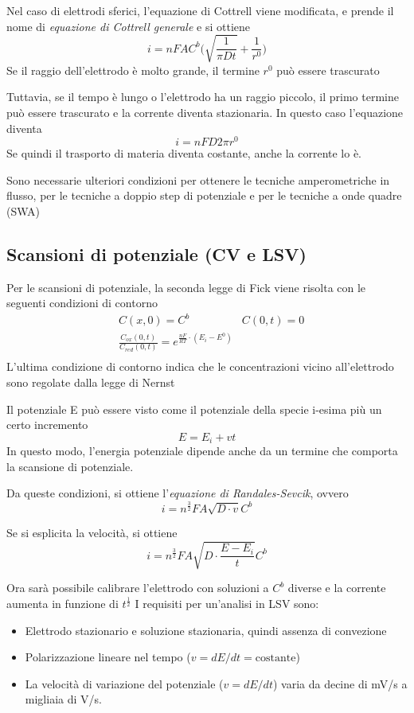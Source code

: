 
Nel caso di elettrodi sferici, l'equazione di Cottrell viene modificata, e prende il nome di \emph{equazione di Cottrell generale}  e si ottiene
\[
i = n F A C^b \biggl(\sqrt{\frac{1}{\pi D t}} + \frac{1}{r^0}\biggr)
\]
Se il raggio dell'elettrodo è molto grande, il termine $r^0$ può essere trascurato

Tuttavia, se il tempo è lungo o l'elettrodo ha un raggio piccolo, il primo termine può essere trascurato e la corrente diventa stazionaria.
In questo caso l'equazione diventa
\[
i = n F D 2 \pi r^0
\]
Se quindi il trasporto di materia diventa costante, anche la corrente lo è.

Sono necessarie ulteriori condizioni per ottenere le tecniche amperometriche in flusso, per le tecniche a doppio step di potenziale e per le tecniche a onde quadre (SWA)

\subsection{Scansioni di potenziale (CV e LSV)}
Per le scansioni di potenziale, la seconda legge di Fick viene risolta con le seguenti condizioni di contorno
\begin{align*}
& C (x,0) = C^b	\
& C (0,t) = 0\\
& \frac{C_{ox} (0,t)}{C_{red} (0,t)} = e^{\frac{nF}{RT} \cdot (E_i - E^0)}\\
\end{align*}
L'ultima condizione di contorno indica che le concentrazioni vicino all'elettrodo sono regolate dalla legge di Nernst


Il potenziale E può essere visto come il potenziale della specie i-esima più un certo incremento
\[
E=E_i + vt
\]
In questo modo, l'energia potenziale dipende anche da un termine che comporta la scansione di potenziale.

Da queste condizioni, si ottiene l'\emph{equazione di Randales-Sevcik}, ovvero
\[
i = n^{\frac{3}{2}} F A \sqrt{D \cdot v} C^b
\]

Se si esplicita la velocità, si ottiene
\[
i = n^{\frac{3}{2}} F A \sqrt{D \cdot \frac{E - E_i}{t}} C^b
\]

Ora sarà possibile calibrare l'elettrodo con soluzioni a $C^b$ diverse e la corrente aumenta in funzione di $t^{\frac{1}{2}}$
I requisiti per un'analisi in LSV sono:
\begin{itemize}
\item Elettrodo stazionario e soluzione stazionaria, quindi assenza di convezione
\item Polarizzazione lineare nel tempo ($v = dE / dt = \text{costante}$)
\item La velocità di variazione del potenziale ($v = dE / dt$) varia da decine di mV/s a migliaia di V/s.
\end{itemize}

